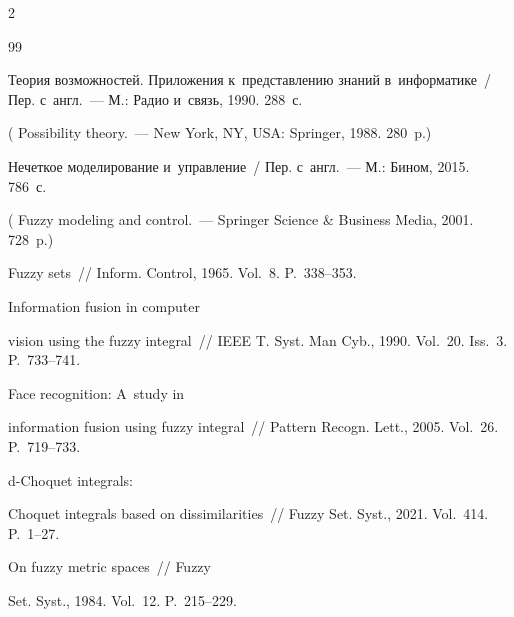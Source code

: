 \begin{multicols}{2}
{{\begin{thebibliography}{99}


 Теория возможностей. Приложения к~пред\-став\-ле\-нию знаний в~информатике~/ Пер. с~англ.~--- М.: Радио и~связь, 1990. 288~с.


( {Possibility theory}.~--- New York, NY, USA: Springer, 1988. 280~p.)







 Нечеткое моделирование и~управ\-ле\-ние~/ Пер. с~англ.~--- М.: Бином,  2015. 786~с.


( {Fuzzy modeling and control}.~--- Springer Science \& Business Media, 2001. 728~p.)







 Fuzzy sets~// Inform. Control, 1965. Vol.~8. P.~338--353.







 Information fusion in computer 


vision using the fuzzy integral~// IEEE T. Syst. Man  Cyb.,  1990. Vol.~20. Iss.~3. P.~733--741.







 Face recognition: A~study in 


information fusion using fuzzy integral~// Pattern Recogn. Lett., 2005. Vol.~26.  P.~719--733.







 d-Choquet integrals: 


Choquet integrals based on dissimilarities~// Fuzzy Set. Syst., 2021. Vol.~414. P.~1--27.







 On fuzzy metric spaces~// Fuzzy 


Set. Syst., 1984.  Vol.~12. P.~215--229.






\end{thebibliography}}}
\end{multicols}
